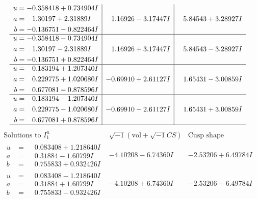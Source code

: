 \documentclass[1p]{elsarticle_modified}
\theoremstyle{definition}
\newcommand{\I}{\sqrt{-1}}
\begin{document}
$$\begin{array}{c|c|c}
\begin{aligned}
u &= -0.358418 + 0.734904 I \\
a &= \phantom{-}1.30197 + 2.31889 I \\
b &= -0.136751 - 0.822464 I\end{aligned}
 & \phantom{-}1.16926 - 3.17447 I & \phantom{-}5.84543 + 3.28927 I \\ \hline\begin{aligned}
u &= -0.358418 - 0.734904 I \\
a &= \phantom{-}1.30197 - 2.31889 I \\
b &= -0.136751 + 0.822464 I\end{aligned}
 & \phantom{-}1.16926 + 3.17447 I & \phantom{-}5.84543 - 3.28927 I \\ \hline\begin{aligned}
u &= \phantom{-}0.183194 + 1.207340 I \\
a &= \phantom{-}0.229775 + 1.020680 I \\
b &= \phantom{-}0.677081 - 0.878596 I\end{aligned}
 & -0.69910 + 2.61127 I & \phantom{-}1.65431 - 3.00859 I \\ \hline\begin{aligned}
u &= \phantom{-}0.183194 - 1.207340 I \\
a &= \phantom{-}0.229775 - 1.020680 I \\
b &= \phantom{-}0.677081 + 0.878596 I\end{aligned}
 & -0.69910 - 2.61127 I & \phantom{-}1.65431 + 3.00859 I\\
 \hline 
 \end{array}$$\newpage$$\begin{array}{c|c|c}  
\text{Solutions to }I^u_{1}& \I (\text{vol} + \sqrt{-1}CS) & \text{Cusp shape}\\
 \hline 
\begin{aligned}
u &= \phantom{-}0.083408 + 1.218640 I \\
a &= \phantom{-}0.31884 - 1.60799 I \\
b &= \phantom{-}0.755833 + 0.932426 I\end{aligned}
 & -4.10208 - 6.74360 I & -2.53206 + 6.49784 I \\ \hline\begin{aligned}
u &= \phantom{-}0.083408 - 1.218640 I \\
a &= \phantom{-}0.31884 + 1.60799 I \\
b &= \phantom{-}0.755833 - 0.932426 I\end{aligned}
 & -4.10208 + 6.74360 I & -2.53206 - 6.49784 I \\ \hline\begin{aligned}

\end{aligned}
\end{array}$$
\end{document}
